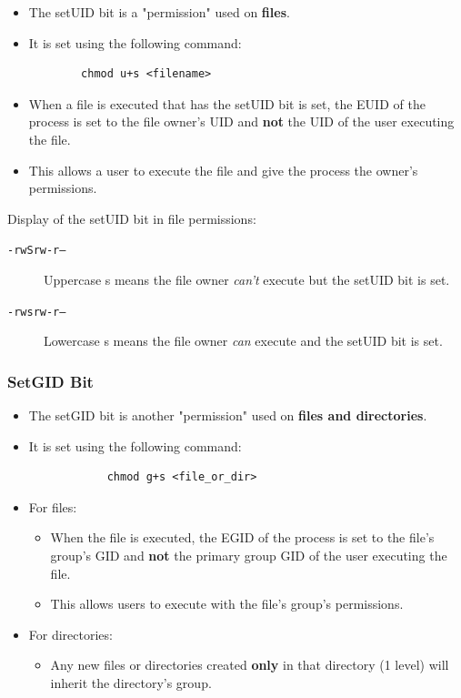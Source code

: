 \documentclass{article}
\newcommand{\code}[1]{\texttt{#1}}
\begin{document}
\begin{itemize}
    \item The setUID bit is a "permission" used on \textbf{files}.
    \item It is set using the following command:
    \begin{center}
        \begin{lstlisting}
        chmod u+s <filename>
        \end{lstlisting}
    \end{center}
    \item When a file is executed that has the setUID bit is set, the EUID of the process is set to the file owner's UID and \textbf{not} the UID of the user executing the file.
    \item This allows a user to execute the file and give the process the owner's permissions.
\end{itemize}

Display of the setUID bit in file permissions:

\begin{description}
    \item[\code{-rwSrw-r--}] Uppercase s means the file owner \emph{can't} execute but the setUID bit is set.
    \item[\code{-rwsrw-r--}] Lowercase s means the file owner \emph{can} execute and the setUID bit is set.
\end{description}

\subsubsection{SetGID Bit}

\begin{itemize}
    \item The setGID bit is another "permission" used on \textbf{files and directories}.
    \item It is set using the following command:
    \begin{center}
        \begin{lstlisting}
            chmod g+s <file_or_dir>
        \end{lstlisting}
    \end{center}
    \item For files:
    \begin{itemize}
        \item When the file is executed, the EGID of the process is set to the file's group's GID and \textbf{not} the primary group GID of the user executing the file.
        \item This allows users to execute with the file's group's permissions.
    \end{itemize}
    \item For directories:
    \begin{itemize}
        \item Any new files or directories created \textbf{only} in that directory (1 level) will inherit the directory's group.
    \end{itemize}
\end{itemize}
\end{document}

